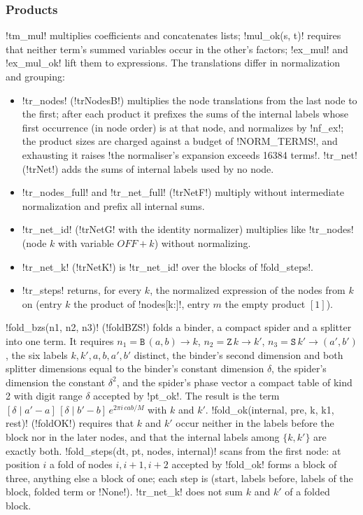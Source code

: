 {{{\subsubsection{Products}

\lexpy!tm_mul! multiplies coefficients and concatenates lists; \lexpy!mul_ok(s, t)! requires that
neither term's summed variables occur in the other's factors; \lexpy!ex_mul! and \lexpy!ex_mul_ok!
lift them to expressions. The translations differ in normalization and grouping:
\begin{itemize}
\item \lexpy!tr_nodes! (\lexlean!trNodesB!) multiplies the node translations from the last node to
the first; after each product it prefixes the sums of the internal labels whose first
occurrence (in node order) is at that node, and normalizes by \lexpy!nf_ex!; the product sizes are
charged against a budget of \lexpy!NORM_TERMS!, and exhausting it raises
\lexcode!the normaliser's expansion exceeds 16384 terms!. \lexpy!tr_net! (\lexlean!trNet!) adds the sums
of internal labels used by no node.
\item \lexpy!tr_nodes_full! and \lexpy!tr_net_full! (\lexlean!trNetF!) multiply without intermediate
normalization and prefix all internal sums.
\item \lexpy!tr_net_id! (\lexlean!trNetG! with the identity normalizer) multiplies like
\lexpy!tr_nodes! (node $k$ with variable $\mathit{OFF}+k$) without normalizing.
\item \lexpy!tr_net_k! (\lexlean!trNetK!) is \lexpy!tr_net_id! over the blocks of \lexpy!fold_steps!.
\item \lexpy!tr_steps! returns, for every $k$, the normalized expression of the nodes from $k$ on
(entry $k$ the product of \lexpy!nodes[k:]!, entry $m$ the empty product $[1]$).
\end{itemize}

\begin{algorithm}\label{alg:lean-export-sym-fold}
\lexpy!fold_bzs(n1, n2, n3)! (\lexlean!foldBZS!) folds a binder, a compact spider and a splitter
into one term. It requires $n_1 = \mathtt{B}\,(a, b) \to k$, $n_2 = \mathtt{Z}\,k \to k'$,
$n_3 = \mathtt{S}\,k' \to (a', b')$, the six labels $k, k', a, b, a', b'$ distinct, the binder's
second dimension and both splitter dimensions equal to the binder's constant dimension $\delta$,
the spider's dimension the constant $\delta^2$, and the spider's phase vector a compact table of
kind 2 with digit range $\delta$ accepted by \lexpy!pt_ok!. The result is the term
$[\delta \mid a' - a]\,[\delta \mid b' - b]\,e^{2\pi i\, c a b/M}$ with $k$ and $k'$.
\lexpy!fold_ok(internal, pre, k, k1, rest)! (\lexlean!foldOK!) requires that $k$ and $k'$ occur
neither in the labels before the block nor in the later nodes, and that the internal labels
among $\{k, k'\}$ are exactly both. \lexpy!fold_steps(dt, pt, nodes, internal)! scans from the
first node: at position $i$ a fold of nodes $i, i+1, i+2$ accepted by \lexpy!fold_ok! forms a
block of three, anything else a block of one; each step is (start, labels before, labels of
the block, folded term or \lexpy!None!). \lexpy!tr_net_k! does not sum $k$ and $k'$ of a folded
block.
\end{algorithm}

}}}
